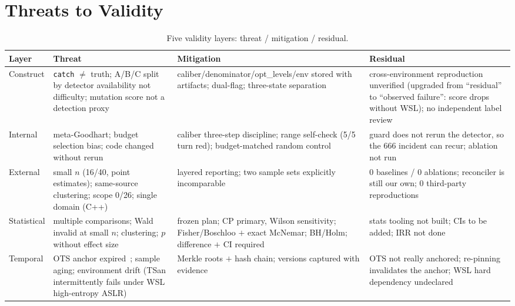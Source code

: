 \documentclass{article}
\begin{document}
\section{Threats to Validity}
\label{sec:validity}
\begin{table}[t]
\caption{Five validity layers: threat / mitigation / residual.}
\label{tab:validity}
\centering
\small
\begin{tabular}{@{}p{1.8cm}p{4.4cm}p{4.0cm}p{3.6cm}@{}}
\toprule
Layer & Threat & Mitigation & Residual \\
\midrule
Construct & \texttt{catch} $\neq$ truth; A/B/C split by detector availability not difficulty; mutation score not a detection proxy~\cite{just2014mutants} & caliber/denominator/opt\_levels/env stored with artifacts; dual-flag; three-state separation & cross-environment reproduction unverified (upgraded from ``residual'' to ``observed failure'': score drops without WSL); no independent label review \\
Internal & meta-Goodhart; budget selection bias; code changed without rerun & caliber three-step discipline; range self-check (5/5 turn red); budget-matched random control & guard does not rerun the detector, so the 666 incident can recur; ablation not run \\
External & small $n$ (16/40, point estimates); same-source clustering; scope 0/26; single domain (C++) & layered reporting; two sample sets explicitly incomparable & 0 baselines / 0 ablations; reconciler is still our own; 0 third-party reproductions \\
Statistical & multiple comparisons; Wald invalid at small $n$; clustering; $p$ without effect size & frozen plan; CP primary, Wilson sensitivity; Fisher/Boschloo $+$ exact McNemar; BH/Holm; difference $+$ CI required & stats tooling not built; CIs to be added; IRR not done \\
Temporal & OTS anchor expired~\cite{opentimestamps}; sample aging; environment drift (TSan intermittently fails under WSL high-entropy ASLR) & Merkle roots $+$ hash chain; versions captured with evidence & OTS not really anchored; re-pinning invalidates the anchor; WSL hard dependency undeclared \\
\bottomrule
\end{tabular}
\end{table}

\end{document}
